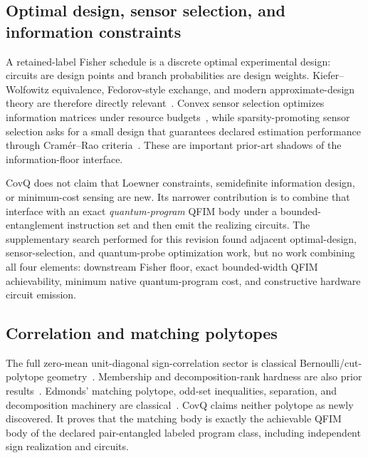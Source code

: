 \documentclass[11pt]{article}
\theoremstyle{definition}
\theoremstyle{remark}
\begin{document}
\subsection{Optimal design, sensor selection, and information constraints}
A retained-label Fisher schedule is a discrete optimal experimental design: circuits are design points and branch probabilities are design weights. Kiefer--Wolfowitz equivalence, Fedorov-style exchange, and modern approximate-design theory are therefore directly relevant~\cite{KieferWolfowitz1960,Fedorov1972,Pukelsheim2006}. Convex sensor selection optimizes information matrices under resource budgets~\cite{JoshiBoyd2009}, while sparsity-promoting sensor selection asks for a small design that guarantees declared estimation performance through Cram\'er--Rao criteria~\cite{ChepuriLeus2015}. These are important prior-art shadows of the information-floor interface.

CovQ does not claim that Loewner constraints, semidefinite information design, or minimum-cost sensing are new. Its narrower contribution is to combine that interface with an exact \emph{quantum-program} QFIM body under a bounded-entanglement instruction set and then emit the realizing circuits. The supplementary search performed for this revision found adjacent optimal-design, sensor-selection, and quantum-probe optimization work, but no work combining all four elements: downstream Fisher floor, exact bounded-width QFIM achievability, minimum native quantum-program cost, and constructive hardware circuit emission.

\subsection{Correlation and matching polytopes}
The full zero-mean unit-diagonal sign-correlation sector is classical Bernoulli/cut-polytope geometry~\cite{HuberMaric2017,Pitowsky1991,DezaLaurent1997}. Membership and decomposition-rank hardness are also prior results~\cite{CapraraEtAl2026}. Edmonds' matching polytope, odd-set inequalities, separation, and decomposition machinery are classical~\cite{Edmonds1965,PadbergRao1982,Schrijver2003,GrotschelLovaszSchrijver1988}. CovQ claims neither polytope as newly discovered. It proves that the matching body is exactly the achievable QFIM body of the declared pair-entangled labeled program class, including independent sign realization and circuits.
\end{document}
